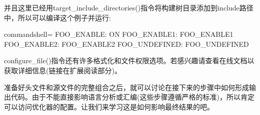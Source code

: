 并且这里已经用target\_include\_directories()指令将构建树目录添加到include路径中，所以可以编译这个例子并运行:

\begin{tcblisting}{commandshell={}}
FOO_ENABLE: ON
FOO_ENABLE1: FOO_ENABLE1
FOO_ENABLE2: FOO_ENABLE2
FOO_UNDEFINED: FOO_UNDEFINED
\end{tcblisting}

configure\_file()指令还有许多格式化和文件权限选项。若感兴趣请查看在线文档以获取详细信息(链接在扩展阅读部分)。

准备好头文件和源文件的完整组合之后，就可以讨论在接下来的步骤中如何形成输出代码。由于不能直接影响语言分析或汇编(这些步骤遵循严格的标准)，所以肯定可以访问优化器的配置。让我们来学习这是如何影响最终结果的吧。

























